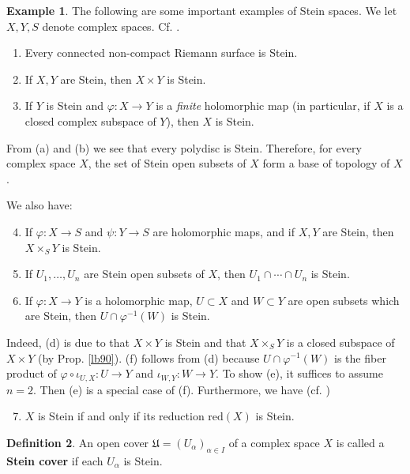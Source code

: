 \documentclass[12pt,b5paper,notitlepage]{report}
\theoremstyle{definition}
\newtheorem{df}{Definition}[section]
\newtheorem{eg}[df]{Example}
\theoremstyle{plain}
\newcommand{\fk}{\mathfrak}
\newcommand{\red}{\mathrm{red}}
\numberwithin{equation}{section}
\begin{document}
\begin{eg}\label{lb329}
The following are some important examples of Stein spaces. We let $X,Y,S$ denote complex spaces. Cf. \cite[Sec. V.1]{GR-a}.
\begin{enumerate}[label=(\alph*)]
\item Every connected non-compact Riemann surface is Stein.
\item If $X,Y$ are Stein, then $X\times Y$ is Stein.
\item If $Y$ is Stein and $\varphi:X\rightarrow Y$ is a \textit{finite} holomorphic map (in particular, if $X$ is a closed complex subspace of $Y$), then $X$ is Stein.
\end{enumerate}
From (a) and (b) we see that every polydisc is Stein. Therefore, for every complex space $X$, the set of Stein open subsets of $X$ form a base of topology of $X$. 

We also have:
\begin{enumerate}[label=(\alph*)]\setcounter{enumi}{3}
\item If $\varphi:X\rightarrow S$ and $\psi:Y\rightarrow S$ are holomorphic maps, and if $X,Y$ are Stein, then $X\times_SY$ is Stein. 
\item If $U_1,\dots,U_n$ are Stein open subsets of $X$, then $U_1\cap\cdots\cap U_n$ is Stein.
\item If $\varphi:X\rightarrow Y$ is a holomorphic map, $U\subset X$ and $W\subset Y$ are open subsets which are Stein, then $U\cap\varphi^{-1}(W)$ is Stein. 
\end{enumerate}
Indeed, (d) is due to that $X\times Y$ is Stein and that $X\times_SY$ is a closed subspace of $X\times Y$ (by Prop. \ref{lb90}). (f) follows from (d) because $U\cap\varphi^{-1}(W)$ is the fiber product of $\varphi\circ\iota_{U,X}:U\rightarrow Y$ and $\iota_{W,Y}:W\rightarrow Y$. To show (e), it suffices to assume $n=2$. Then (e) is a special case of (f). Furthermore, we have (cf. \cite[Sec. V.4.3]{GR-a})
\begin{enumerate}[label=(\alph*)]\setcounter{enumi}{6}
\item $X$ is Stein if and only if its reduction $\red(X)$ is Stein.
\end{enumerate}
\hfill\qedsymbol
\end{eg}




\begin{df}
An open cover $\fk U=(U_\alpha)_{\alpha\in I}$ of a complex space $X$ is called a \textbf{Stein cover} if each $U_\alpha$ is Stein.  
\end{df}
\end{document}
